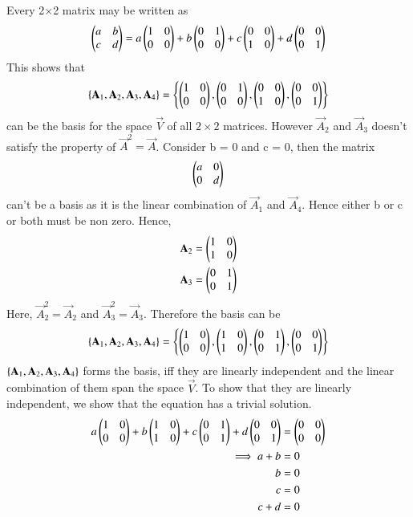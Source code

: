 Every 2$\times$2 matrix may be written as
\begin{align}
	\begin{pmatrix}a & b\\c & d\end{pmatrix} = a\begin{pmatrix}1 & 0\\0 & 0\end{pmatrix} + b\begin{pmatrix}0 & 1\\0 & 0\end{pmatrix} + c\begin{pmatrix}0& 0\\1 & 0\end{pmatrix} + d\begin{pmatrix}0 & 0\\0 & 1\end{pmatrix}
\end{align}
This shows that 
\begin{align}
	\left\{\mathbf{A}_1, \mathbf{A}_2, \mathbf{A}_3, \mathbf{A}_4\right\} = \left\{\begin{pmatrix}1 & 0\\0 & 0\end{pmatrix}, \begin{pmatrix}0 & 1\\0 & 0\end{pmatrix}, \begin{pmatrix}0& 0\\1 & 0\end{pmatrix}, \begin{pmatrix}0 & 0\\0 & 1\end{pmatrix}\right\}
\end{align}
can be the basis for the space $\vec{V}$ of all $2\times2$ matrices. However $\vec{A}_2$ and $\vec{A}_3$ doesn't satisfy the property of $\vec{A}^2 = \vec{A}$. Consider b = 0 and c = 0, then the matrix 
\begin{align}
	\begin{pmatrix}a & 0\\ 0& d\end{pmatrix} 
\end{align}
can't be a basis as it is the linear combination of $\vec{A}_1$ and $\vec{A}_4$. Hence either b or c or both must be non zero. Hence,
\begin{align}
	\mathbf{A}_2 &= \begin{pmatrix}1 & 0\\1 & 0\end{pmatrix}\\
	\mathbf{A}_3 &=  \begin{pmatrix}0 & 1\\0 & 1\end{pmatrix}
\end{align}
Here, $\vec{A}_2^2 = \vec{A}_2$ and $\vec{A}_3^2 = \vec{A}_3$. Therefore the basis can be
\begin{align}
	\left\{\mathbf{A}_1, \mathbf{A}_2, \mathbf{A}_3, \mathbf{A}_4\right\} = \left\{\begin{pmatrix}1 & 0\\0 & 0\end{pmatrix}, \begin{pmatrix}1 & 0\\1 & 0\end{pmatrix}, \begin{pmatrix}0& 1\\0 & 1\end{pmatrix}, \begin{pmatrix}0 & 0\\0 & 1\end{pmatrix}\right\}
\end{align}
$\left\{\mathbf{A}_1, \mathbf{A}_2, \mathbf{A}_3, \mathbf{A}_4\right\}$ forms the basis, iff they are linearly independent and the linear combination of them span the space $\vec{V}$. To show that they are linearly independent, we show that the equation has a trivial solution.
\begin{align}
	a\begin{pmatrix}1 & 0\\0 & 0\end{pmatrix} + b\begin{pmatrix}1 & 0\\1 & 0\end{pmatrix} + c\begin{pmatrix}0& 1\\0 & 1\end{pmatrix} + d\begin{pmatrix}0 & 0\\0 & 1\end{pmatrix} &= \begin{pmatrix}0 & 0 \\ 0 & 0\end{pmatrix}\\
	\implies a + b &= 0\\ 
	b &= 0\\
	c &= 0\\ 
	c + d &= 0
\end{align}

